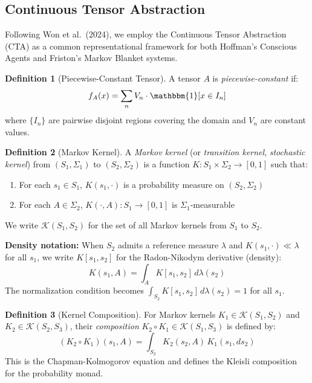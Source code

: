 \documentclass[11pt,a4paper]{article}
\theoremstyle{definition}
\newtheorem{definition}{Definition}[section]
\theoremstyle{plain}
\theoremstyle{remark}
\begin{document}
\subsection{Continuous Tensor Abstraction}

Following Won et al.\ (2024), we employ the Continuous Tensor Abstraction (CTA) as a common representational framework for both Hoffman's Conscious Agents and Friston's Markov Blanket systems.

\begin{definition}[Piecewise-Constant Tensor]
A tensor $A$ is \emph{piecewise-constant} if:
\[
f_A(x) = \sum_n V_n \cdot \mathbbm{1}[x \in I_n]
\]
where $\{I_n\}$ are pairwise disjoint regions covering the domain and $V_n$ are constant values.
\end{definition}

\begin{definition}[Markov Kernel]\label{def:markov-kernel}
A \emph{Markov kernel} (or \emph{transition kernel}, \emph{stochastic kernel}) from $(S_1, \Sigma_1)$ to $(S_2, \Sigma_2)$ is a function $K: S_1 \times \Sigma_2 \to [0,1]$ such that:
\begin{enumerate}[label=(\roman*)]
    \item For each $s_1 \in S_1$, $K(s_1, \cdot)$ is a probability measure on $(S_2, \Sigma_2)$
    \item For each $A \in \Sigma_2$, $K(\cdot, A): S_1 \to [0,1]$ is $\Sigma_1$-measurable
\end{enumerate}
We write $\mathcal{K}(S_1, S_2)$ for the set of all Markov kernels from $S_1$ to $S_2$.

\textbf{Density notation:} When $S_2$ admits a reference measure $\lambda$ and $K(s_1, \cdot) \ll \lambda$ for all $s_1$, we write $K[s_1, s_2]$ for the Radon-Nikodym derivative (density):
\[
K(s_1, A) = \int_A K[s_1, s_2] \, d\lambda(s_2)
\]
The normalization condition becomes $\int_{S_2} K[s_1, s_2] \, d\lambda(s_2) = 1$ for all $s_1$.
\end{definition}

\begin{definition}[Kernel Composition]
For Markov kernels $K_1 \in \mathcal{K}(S_1, S_2)$ and $K_2 \in \mathcal{K}(S_2, S_3)$, their \emph{composition} $K_2 \circ K_1 \in \mathcal{K}(S_1, S_3)$ is defined by:
\[
(K_2 \circ K_1)(s_1, A) = \int_{S_2} K_2(s_2, A) \, K_1(s_1, ds_2)
\]
This is the Chapman-Kolmogorov equation and defines the Kleisli composition for the probability monad.
\end{definition}
\end{document}
